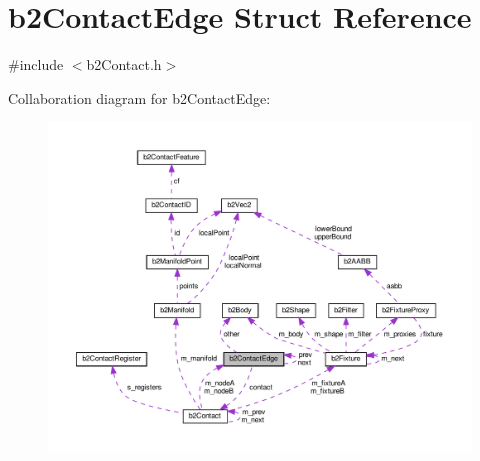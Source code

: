 \hypertarget{structb2ContactEdge}{}\section{b2\+Contact\+Edge Struct Reference}
\label{structb2ContactEdge}


{\ttfamily \#include $<$b2\+Contact.\+h$>$}



Collaboration diagram for b2\+Contact\+Edge\+:
\nopagebreak
\begin{figure}[H]
\begin{center}
\leavevmode
\includegraphics[width=350pt]{structb2ContactEdge__coll__graph}
\end{center}
\end{figure}
